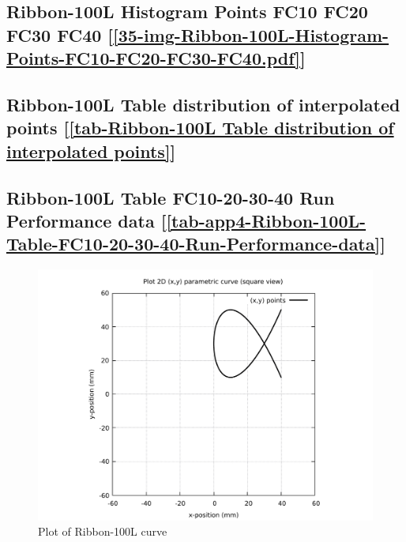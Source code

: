 \subsection       {Ribbon-100L Histogram Points FC10 FC20 FC30 FC40
	[\ref      {35-img-Ribbon-100L-Histogram-Points-FC10-FC20-FC30-FC40.pdf}] }
\label{ssec-35-img-Ribbon-100L-Histogram-Points-FC10-FC20-FC30-FC40.pdf}

\subsection    {Ribbon-100L Table distribution of interpolated points
	[\ref      {tab-Ribbon-100L Table distribution of interpolated points}] }
\label{ssec-tab-Ribbon-100L Table distribution of interpolated points}

\subsection             {Ribbon-100L Table FC10-20-30-40 Run Performance data
	[\ref      {tab-app4-Ribbon-100L-Table-FC10-20-30-40-Run-Performance-data}] }
\label{ssec-tab-app4-Ribbon-100L-Table-FC10-20-30-40-Run-Performance-data}


\clearpage
\pagebreak

\begin{figure}
	\caption     {Plot of Ribbon-100L curve}
	\label{01-img-Plot of Ribbon-100L curve.pdf}
	\includegraphics[width=1.00\textwidth]{Chap4/appendix/app-Ribbon-100L/plots/01-img-Plot of Ribbon-100L curve.pdf}
\end{figure}	


